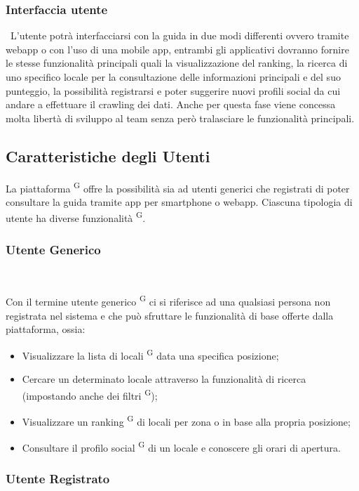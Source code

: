 \subsubsection{Interfaccia utente} \ 
L’utente potrà interfacciarsi con la guida in due modi differenti ovvero tramite webapp o con l’uso di una mobile app, entrambi gli applicativi dovranno fornire le stesse funzionalità principali quali la visualizzazione del ranking, la ricerca di uno specifico locale per la consultazione delle informazioni principali e del suo punteggio, la possibilità registrarsi e poter suggerire nuovi profili social da cui andare a effettuare il crawling dei dati.
Anche per questa fase viene concessa molta libertà di sviluppo al team senza però tralasciare le funzionalità principali.

\subsection{Caratteristiche degli Utenti}

La piattaforma \textsuperscript{G} offre la possibilità sia ad utenti generici che registrati di poter consultare la guida tramite app per smartphone o webapp. Ciascuna tipologia di utente ha diverse funzionalità \textsuperscript{G}.

\subsubsection{Utente Generico} \ 

Con il termine utente generico \textsuperscript{G} ci si riferisce ad una qualsiasi persona non registrata nel sistema e che può sfruttare le funzionalità di base offerte dalla piattaforma, ossia:

\begin{itemize}
  \item Visualizzare la lista di locali \textsuperscript{G} data una specifica posizione;
  \item Cercare un determinato locale attraverso la funzionalità di ricerca (impostando anche dei filtri \textsuperscript{G});
  \item Visualizzare un ranking \textsuperscript{G} di locali per zona o in base alla propria posizione;
  \item Consultare il profilo social \textsuperscript{G} di un locale e conoscere gli orari di apertura.
\end{itemize}

\subsubsection{Utente Registrato} \ 

